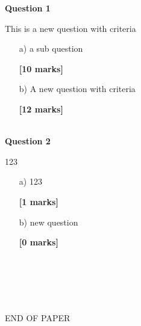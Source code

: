 \documentclass[11pt]{article}
\begin{document}
	\pagestyle{fancy}
	\fancyhf{}
	
	\setcounter{page}{1}
	
	
        \textbf{Question 1}

        This is a new question with criteria
        \begin{enumerate}
            
        \item[a) ]a sub question
        \begin{flushright}
            \textbf{[10 marks]}
        \end{flushright}
    
        \item[b) ]A new question with criteria
        \begin{flushright}
            \textbf{[12 marks]}
        \end{flushright}
    
        \end{enumerate}
        ~\\
    
        \textbf{Question 2}

        123
        \begin{enumerate}
            
        \item[a) ]123
        \begin{flushright}
            \textbf{[1 marks]}
        \end{flushright}
    
        \item[b) ]new question
        \begin{flushright}
            \textbf{[0 marks]}
        \end{flushright}
    
        \end{enumerate}
        ~\\
    
	
	
	~\\~\\~\\
	\begin{center}
		END OF PAPER
	\end{center}
	
	
	\label{unknown}
\end{document}
